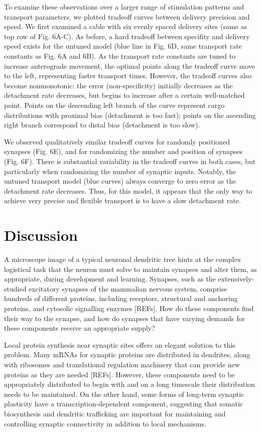 \documentclass[10pt]{wlpeerj}
\begin{document}
To examine these observations over a larger range of stimulation patterns and transport parameters, we plotted tradeoff curves between delivery precision and speed.
We first examined a cable with six evenly spaced delivery sites (same as top row of Fig. 6A-C).
As before, a hard tradeoff between specifity and delivery speed exists for the untuned model (blue line in Fig. 6D, same transport rate constants as Fig. 6A and 6B).
As the transport rate constants are tuned to increase anterograde movement, the optimal points along the tradeoff curve move to the left, representing faster transport times.
However, the tradeoff curves also become nonmonotonic: the error (non-specificity) initially decreases as the detachment rate decreases, but begins to increase after a certain well-matched point.
Points on the descending left branch of the curve represent cargo distributions with proximal bias (detachment is too fast); points on the ascending right branch correspond to distal bias (detachment is too slow).

We observed qualitatively similar tradeoff curves for randomly positioned synapses (Fig. 6E), and for randomizing the number and position of synapses (Fig. 6F). There is substantial variability in the tradeoff curves in both cases, but particularly when randomizing the number of synaptic inputs. Notably, the untuned transport model (blue curves) always converge to zero error as the detachment rate decreases. Thus, for this model, it appears that the only way to achieve very precise and flexible transport is to have a slow detachment rate.

\section*{Discussion}

A microscope image of a typical neuronal dendritic tree hints at the complex logistical task that the neuron must solve to maintain synapses and alter them, as appropriate, during development and learning.
Synapses, such as the extensively-studied excitatory synapses of the mammalian nervous system, comprise hundreds of different proteins, including receptors, structural and anchoring proteins, and cytosolic signalling enzymes [REFs].
How do these components find their way to the synapse, and how do synapses that have varying demands for these components receive an appropriate supply?

Local protein synthesis near synaptic sites offers an elegant solution to this problem.
Many mRNAs for synaptic proteins are distributed in dendrites, along with ribosomes and translational regulation machinery that can provide new proteins as they are needed [REFs].
However, these components need to be appropriately distributed to begin with and on a long timescale their distribution needs to be maintained.
On the other hand, some forms of long-term synaptic plasticity have a transcription-dependent component, suggesting that somatic biosynthesis and dendritic trafficking are important for maintaining and controlling synaptic connectivity in addition to local mechanisms.
\end{document}
